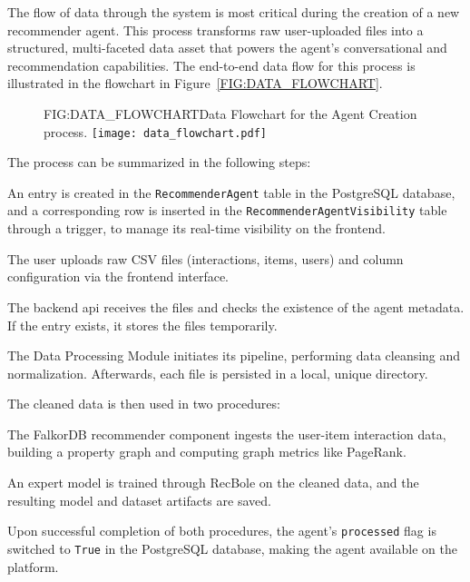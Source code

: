 The flow of data through the system is most critical during the creation of a new recommender agent. This process transforms raw user-uploaded files into a structured, multi-faceted data asset that powers the agent's conversational and recommendation capabilities. The end-to-end data flow for this process is illustrated in the flowchart in Figure~\ref{FIG:DATA_FLOWCHART}.

\begin{figure}[Data Flowchart for Agent Creation]{FIG:DATA_FLOWCHART}{Data Flowchart for the Agent Creation process.}
    \texttt{[image: data\_flowchart.pdf]}
\end{figure}

The process can be summarized in the following steps:
\begin{compactenum}
    \item An entry is created in the \texttt{RecommenderAgent} table in the PostgreSQL database, and a corresponding row is inserted in the \texttt{RecommenderAgentVisibility} table through a trigger, to manage its real-time visibility on the frontend.
    \item The user uploads raw CSV files (interactions, items, users) and column configuration via the frontend interface.
    \item The backend \acs{api} receives the files and checks the existence of the agent metadata. If the entry exists, it stores the files temporarily.
    \item The Data Processing Module initiates its pipeline, performing data cleansing and normalization. Afterwards, each file is persisted in a local, unique directory.
    \item The cleaned data is then used in two procedures:
    \begin{compactenum}
        \item The FalkorDB recommender component ingests the user-item interaction data, building a property graph and computing graph metrics like PageRank.
        \item An expert model \cite{EASER} is trained through RecBole on the cleaned data, and the resulting model and dataset artifacts are saved.
    \end{compactenum}
    \item Upon successful completion of both procedures, the agent's \texttt{processed} flag is switched to \texttt{True} in the PostgreSQL database, making the agent available on the platform.
\end{compactenum}

\newpage